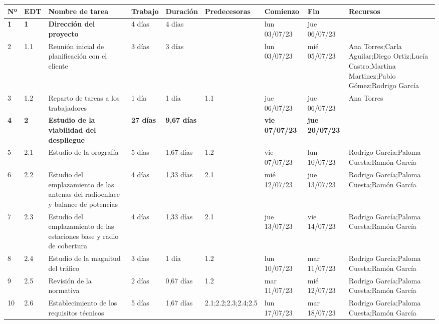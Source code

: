 
\begin{landscape}
    \begin{table}[p]
    \scriptsize
    \centering
    \renewcommand{\arraystretch}{1.2}
    \begin{tabular}{|l|l|p{5.5cm}|l|l|l|l|l|p{5.5cm}|}
    \hline
    \textbf{Nº} & \textbf{EDT} & \textbf{Nombre de tarea} & \textbf{Trabajo} & \textbf{Duración} & \textbf{Predecesoras} & \textbf{Comienzo} & \textbf{Fin} & \textbf{Recursos} \\ \hline\hline
    \textbf{1} & \textbf{1} & \textbf{Dirección del proyecto} & 4 días & 4 días &  & lun 03/07/23 & jue 06/07/23 &  \\ \hline
    2 & 1.1 & Reunión inicial de planificación con el cliente & 3 días & 3 días &  & lun 03/07/23 & mié 05/07/23 & Ana Torres;Carla Aguilar;Diego Ortiz;Lucía   Castro;Martina Martinez;Pablo Gómez;Rodrigo García \\ \hline
    3 & 1.2 & Reparto de tareas a los trabajadores & 1 día & 1 día & 1.1 & jue 06/07/23 & jue 06/07/23 & Ana Torres \\ \hline
    \textbf{4} & \textbf{2} & \textbf{Estudio de la viabilidad del despliegue} & \textbf{27 días} & \textbf{9,67 días} & \textbf{} & \textbf{vie 07/07/23} & \textbf{jue 20/07/23} & \textbf{} \\ \hline
    5 & 2.1 & Estudio de la orografía & 5 días & 1,67 días & 1.2 & vie 07/07/23 & lun 10/07/23 & Rodrigo García;Paloma Cuesta;Ramón García \\ \hline
    6 & 2.2 & Estudio del emplazamiento de las antenas del   radioenlace y balance de potencias & 4 días & 1,33 días & 2.1 & mié 12/07/23 & jue 13/07/23 & Rodrigo García;Paloma Cuesta;Ramón García \\ \hline
    7 & 2.3 & Estudio del emplazamiento de las estaciones   base y radio de cobertura & 4 días & 1,33 días & 2.1 & jue 13/07/23 & vie 14/07/23 & Rodrigo García;Paloma Cuesta;Ramón García \\ \hline
    8 & 2.4 & Estudio de la magnitud del tráfico & 3 días & 1 día & 1.2 & lun 10/07/23 & mar 11/07/23 & Rodrigo García;Paloma Cuesta;Ramón García \\ \hline
    9 & 2.5 & Revisión de la normativa & 2 días & 0,67 días & 1.2 & mar 11/07/23 & mié 12/07/23 & Rodrigo García;Paloma Cuesta;Ramón García \\ \hline
    10 & 2.6 & Establecimiento de los requisitos técnicos & 5 días & 1,67 días & 2.1;2.2;2.3;2.4;2.5 & lun 17/07/23 & mar 18/07/23 & Rodrigo García;Paloma Cuesta;Ramón García \\ \hline

\end{tabular}
\end{table}
\end{landscape}
